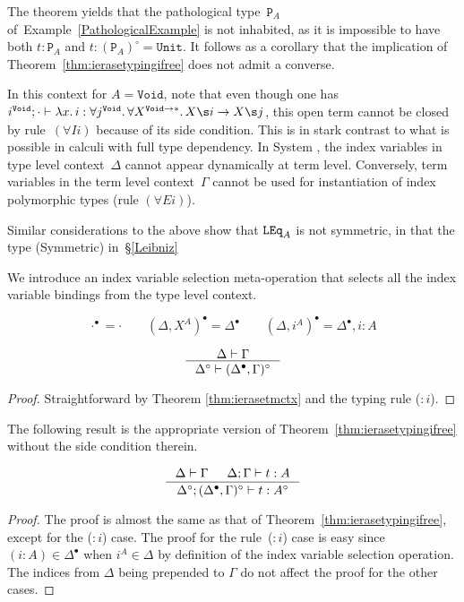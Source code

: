 \begin{example}\label{PathologicalExampleContinued}
The theorem yields that the pathological type~$\mathtt P_A$
of~Example~\ref{PathologicalExample} is not inhabited, as it is impossible
to have both $t:\mathtt P_A$ and $t:(\mathtt P_A)^\circ=\mathtt{Unit}$.
It follows as a corollary that the implication of
Theorem~\ref{thm:ierasetypingifree} does not admit a converse.

In this context for $A=\mathtt{Void}$, note that even though one has
$i^\mathtt{Void};\cdot\vdash\lambda x.\,i:\forall
j^{\mathtt{Void}}.\,\forall X^{\mathtt{Void}\to*}.\, X\s i\to X\s j$, 
this open term %
cannot be closed by rule~$(\forall Ii)$ because of its side
condition.  This is in stark contrast to what is possible in calculi with
full type dependency. In System \Fi, the index variables
in type level context~$\Delta$ cannot appear dynamically at term level.
Conversely, term variables in the term level context~$\Gamma$ cannot be
used for instantiation of index polymorphic types (rule $(\forall Ei)$).

Similar considerations to the above show that $\mathtt{LEq}_A$ is not symmetric,
in that the type {\small\rm(Symmetric)} in~\S\ref{Leibniz}
\end{example}

We introduce an index variable selection meta-operation that selects all
the index variable bindings from the type level context.

\begin{definition}
\[ \cdot^\bullet = \cdot \qquad
	(\Delta,X^A)^\bullet = \Delta^\bullet \qquad
	(\Delta,i^A)^\bullet = \Delta^\bullet,i:A
\]
\end{definition}

\begin{theorem}
\label{thm:ierasetmctxivs}
\[ \inference{\Delta |- \Gamma}{\Delta^\circ |- (\Delta^\bullet,\Gamma)^\circ}
\]
\end{theorem}
\begin{proof}
Straightforward by Theorem \ref{thm:ierasetmctx} and the typing rule ($:i$).
\end{proof}

The following result is the appropriate version of
Theorem~\ref{thm:ierasetypingifree} without the side condition therein.

\begin{theorem}
\label{thm:ierasetypingall}
\[ \inference{\Delta |- \Gamma & \Delta;\Gamma |- t : A}
		{\Delta^\circ;(\Delta^\bullet,\Gamma)^\circ |- t : A^\circ}
\]
\end{theorem}
\begin{proof}
	The proof is almost the same as that of
	Theorem~\ref{thm:ierasetypingifree}, except for the ($:i$) case.
	The proof for the rule~($:i$) case is easy
	since $(i:A) \in \Delta^\bullet$ when $i^A \in \Delta$ by definition of
	the index variable selection operation. The indices from $\Delta$
	being prepended to $\Gamma$ do not affect the proof for the other cases.
\end{proof}

